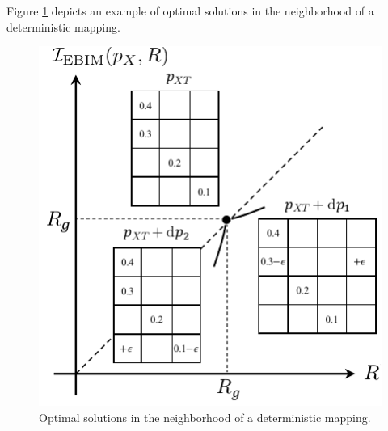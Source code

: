 \begin{example}    
Figure \ref{ch3:fig:didh} depicts an example of optimal solutions in the neighborhood of a deterministic mapping.
\begin{figure}[h] 
\centering
\includegraphics[width=0.35\linewidth]{figs/ch3/didh2.pdf}
\caption{Optimal solutions in the neighborhood of a deterministic mapping.}\label{ch3:fig:didh} 
\end{figure}

\FloatBarrier
\end{example}


